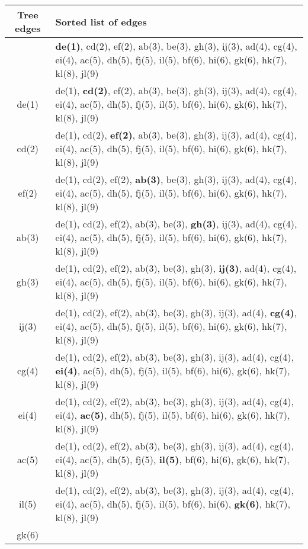 \documentclass{article}
\begin{document}
\begin{center}
  \begin{tabularx}{\textwidth}{c X}
    \hline
    Tree edges & Sorted list of edges \\
    \hline 
    & \textbf{de(1)}, cd(2), ef(2), ab(3), be(3), gh(3), ij(3), ad(4), cg(4), ei(4), ac(5), dh(5), fj(5), il(5), bf(6), hi(6), gk(6), hk(7), kl(8), jl(9)\\
    de(1) & de(1), \textbf{cd(2)}, ef(2), ab(3), be(3), gh(3), ij(3), ad(4), cg(4), ei(4), ac(5), dh(5), fj(5), il(5), bf(6), hi(6), gk(6), hk(7), kl(8), jl(9)\\
    cd(2) & de(1), cd(2), \textbf{ef(2)}, ab(3), be(3), gh(3), ij(3), ad(4), cg(4), ei(4), ac(5), dh(5), fj(5), il(5), bf(6), hi(6), gk(6), hk(7), kl(8), jl(9)\\
    ef(2) & de(1), cd(2), ef(2), \textbf{ab(3)}, be(3), gh(3), ij(3), ad(4), cg(4), ei(4), ac(5), dh(5), fj(5), il(5), bf(6), hi(6), gk(6), hk(7), kl(8), jl(9)\\
    ab(3) & de(1), cd(2), ef(2), ab(3), be(3), \textbf{gh(3)}, ij(3), ad(4), cg(4), ei(4), ac(5), dh(5), fj(5), il(5), bf(6), hi(6), gk(6), hk(7), kl(8), jl(9)\\
    gh(3) & de(1), cd(2), ef(2), ab(3), be(3), gh(3), \textbf{ij(3)}, ad(4), cg(4), ei(4), ac(5), dh(5), fj(5), il(5), bf(6), hi(6), gk(6), hk(7), kl(8), jl(9)\\
    ij(3) & de(1), cd(2), ef(2), ab(3), be(3), gh(3), ij(3), ad(4), \textbf{cg(4)}, ei(4), ac(5), dh(5), fj(5), il(5), bf(6), hi(6), gk(6), hk(7), kl(8), jl(9)\\
    cg(4) & de(1), cd(2), ef(2), ab(3), be(3), gh(3), ij(3), ad(4), cg(4), \textbf{ei(4)}, ac(5), dh(5), fj(5), il(5), bf(6), hi(6), gk(6), hk(7), kl(8), jl(9)\\
    ei(4) & de(1), cd(2), ef(2), ab(3), be(3), gh(3), ij(3), ad(4), cg(4), ei(4), \textbf{ac(5)}, dh(5), fj(5), il(5), bf(6), hi(6), gk(6), hk(7), kl(8), jl(9)\\
    ac(5) & de(1), cd(2), ef(2), ab(3), be(3), gh(3), ij(3), ad(4), cg(4), ei(4), ac(5), dh(5), fj(5), \textbf{il(5)}, bf(6), hi(6), gk(6), hk(7), kl(8), jl(9)\\
    il(5) & de(1), cd(2), ef(2), ab(3), be(3), gh(3), ij(3), ad(4), cg(4), ei(4), ac(5), dh(5), fj(5), il(5), bf(6), hi(6), \textbf{gk(6)}, hk(7), kl(8), jl(9)\\
    gk(6) & \\ 
    \hline
  \end{tabularx}
\end{center}
\end{document}

